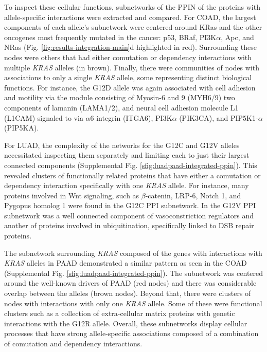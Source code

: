 \documentclass[english, 10pt, letterpaper]{article}
\newcommand{\KRAS}{\emph{KRAS}}
\newcommand{\kras}{KRas}
\begin{document}
To inspect these cellular functions, subnetworks of the PPIN of the proteins with allele-specific interactions were extracted and compared.
For COAD, the largest components of each allele's subnetwork were centered around \kras{} and the other oncogenes most frequently mutated in the cancer: p53, BRaf, PI3K$\alpha$, Apc, and NRas (Fig. \ref{fig:results-integration-main}d highlighted in red).
Surrounding these nodes were others that had either comutation or dependency interactions with multiple \KRAS{} alleles (in brown).
Finally, there were communities of nodes with associations to only a single \KRAS{} allele, some representing distinct biological functions.
For instance, the G12D allele was again associated with cell adhesion and motility via the module consisting of Myosin-6 and 9 (MYH6/9) two components of lamanin (LAMA1/2), and neural cell adhesion molecule L1 (L1CAM) signaled to via $\alpha$6 integrin (ITGA6), PI3K$\alpha$ (PIK3CA), and PIP5K1-$\alpha$ (PIP5KA).

For LUAD, the complexity of the networks for the G12C and G12V alleles necessitated inspecting them separately and limiting each to just their largest connected components (Supplemental Fig. \ref{sfig:luadpaad-integrated-ppin}).
This revealed clusters of functionally related proteins that have either a comutation or dependency interaction specifically with one \KRAS{} allele.
For instance, many proteins involved in Wnt signaling, such as $\beta$-catenin, LRP-6, Notch 1, and Pygopus homolog 1 were found in the G12C PPI subnetwork.
In the G12V PPI subnetwork was a well connected component of vasoconstriction regulators and another of proteins involved in ubiquitination, specifically linked to DSB repair proteins.

The subnetwork surrounding \KRAS{} composed of the genes with interactions with \KRAS{} alleles in PAAD demonstrated a similar pattern as seen in the COAD (Supplemental Fig. \ref{sfig:luadpaad-integrated-ppin}).
The subnetwork was centered around the well-known drivers of PAAD (red nodes) and there was considerable overlap between the alleles (brown nodes).
Beyond that, there were clusters of nodes with interactions with only one \KRAS{} allele.
Some of these were functional clusters such as a collection of extra-cellular matrix proteins with genetic interactions with the G12R allele.
Overall, these subnetworks display cellular processes that have strong allele-specific associations composed of a combination of comutation and dependency interactions.
\end{document}
